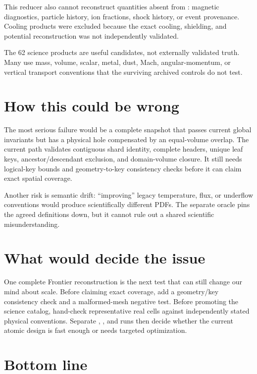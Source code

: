 \documentclass[11pt]{article}
\begin{document}
This reducer also cannot reconstruct quantities absent from
: magnetic diagnostics, particle history, ion fractions,
shock history, or event provenance. Cooling products were excluded because
the exact cooling, shielding, and potential reconstruction was not independently
validated.

The 62 science products are useful candidates, not externally validated truth.
Many use mass, volume, scalar, metal, dust, Mach, angular-momentum, or vertical
transport conventions that the surviving archived controls do not test.

\section{How this could be wrong}

The most serious failure would be a complete snapshot that passes current
global invariants but has a physical hole compensated by an equal-volume
overlap. The current path validates contiguous shard identity, complete
headers, unique leaf keys, ancestor/descendant exclusion, and domain-volume
closure. It still needs logical-key bounds and geometry-to-key consistency
checks before it can claim exact spatial coverage.

Another risk is semantic drift: ``improving'' legacy temperature, flux, or
underflow conventions would produce scientifically different PDFs. The
separate oracle pins the agreed definitions down, but it cannot rule out a
shared scientific misunderstanding.

\section{What would decide the issue}

One complete  Frontier reconstruction is the
next test that can still change our mind about scale. Before claiming exact
coverage, add a geometry/key consistency check and a malformed-mesh negative
test. Before promoting the science catalog, hand-check representative real
cells against independently stated physical conventions. Separate
, , and  runs then decide
whether the current atomic design is fast enough or needs targeted optimization.

\section{Bottom line}
\end{document}
